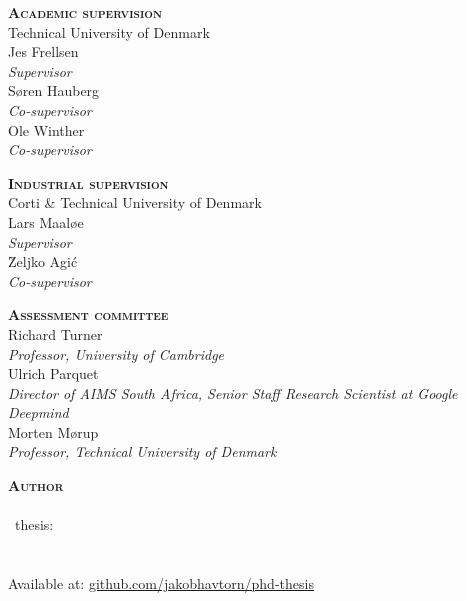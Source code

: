

\thispagestyle{empty} %

\hfill\vfill

\noindent
\small%
\textsc{\textbf{Academic supervision}}\\
Technical University of Denmark
\medskip
\\Jes Frellsen\\
\textit{Supervisor}%
\medskip
\\Søren Hauberg\\
\textit{Co-supervisor}%
\medskip
\\Ole Winther\\
\textit{Co-supervisor}%
\medskip

\bigskip
\noindent
\textsc{\textbf{Industrial supervision}}\\
Corti \& Technical University of Denmark
\medskip
\\Lars Maaløe\\
\textit{Supervisor}%
\medskip
\\\u{Z}eljko Agi\'c\\
\textit{Co-supervisor}%
\medskip

\bigskip
\noindent
\textsc{\textbf{Assessment committee}}
\medskip
\\Richard Turner\\
\textit{Professor, University of Cambridge}
\medskip
\\Ulrich Parquet\\
\textit{Director of AIMS South Africa, Senior Staff Research Scientist at Google Deepmind}
\medskip
\\Morten Mørup\\
\textit{Professor, Technical University of Denmark} %
\medskip

\bigskip
\noindent
\textsc{\textbf{Author}}
\medskip
\\\thesisauthor\\
\thesistypeabbr\ thesis:\\
\textit{\thesistitle}\\
\textcopyright\ \thesismonth\ \thesisyear\\
Available at: \href{https://github.com/JakobHavtorn/phd-thesis}{github.com/jakobhavtorn/phd-thesis}

\normalsize
\normalfont
